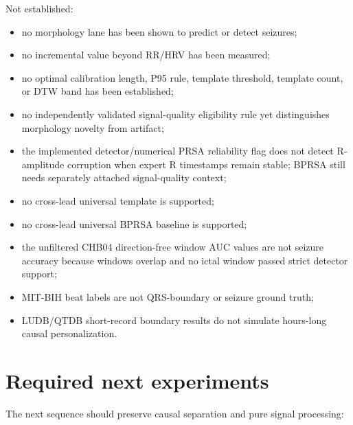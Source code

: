 \documentclass[11pt,a4paper]{article}
\begin{document}
Not established:

\begin{itemize}
  \item no morphology lane has been shown to predict or detect seizures;
  \item no incremental value beyond RR/HRV has been measured;
  \item no optimal calibration length, P95 rule, template threshold, template count, or DTW band has been established;
  \item no independently validated signal-quality eligibility rule yet distinguishes morphology novelty from artifact;
  \item the implemented detector/numerical PRSA reliability flag does not detect R-amplitude corruption when expert R timestamps remain stable; BPRSA still needs separately attached signal-quality context;
  \item no cross-lead universal template is supported;
  \item no cross-lead universal BPRSA baseline is supported;
  \item the unfiltered CHB04 direction-free window AUC values are not seizure accuracy because windows overlap and no ictal window passed strict detector support;
  \item MIT-BIH beat labels are not QRS-boundary or seizure ground truth;
  \item LUDB/QTDB short-record boundary results do not simulate hours-long causal personalization.
\end{itemize}

\section{Required next experiments}
\label{sec:next}

The next sequence should preserve causal separation and pure signal processing:
\end{document}
